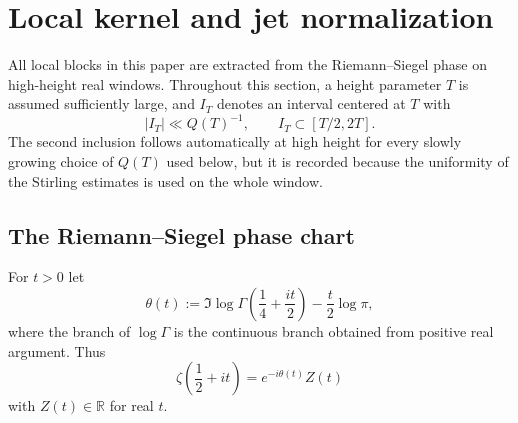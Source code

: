 %

\section{Local kernel and jet normalization}
\label{sec:local-kernel-and-jet-normalization}
\quad
{}\quad
{}\quad
{}\quad
{}\quad
{}
\par\medskip

All local blocks in this paper are extracted from the Riemann--Siegel phase
on high-height real windows.  Throughout this section, a height parameter
\(T\) is assumed sufficiently large, and \(I_T\) denotes an interval centered
at \(T\) with
\[
        |I_T|\ll Q(T)^{-1},
        \qquad I_T\subset [T/2,2T].
\]
The second inclusion follows automatically at high height for every slowly
growing choice of \(Q(T)\) used below, but it is recorded because the
uniformity of the Stirling estimates is used on the whole window.

\subsection{The Riemann--Siegel phase chart}
\label{subsec:local-phase-chart}

\begin{definition}
\label{def:riemann-siegel-phase}
For \(t>0\) let
\begin{equation}
\label{eq:theta-definition}
 \theta(t)
 := \Im \log \Gamma\!\left(\frac14+\frac{it}{2}\right)
    -\frac{t}{2}\log\pi,
\end{equation}
where the branch of \(\log\Gamma\) is the continuous branch obtained from
positive real argument.  Thus
\[
        \zeta\!\left(\frac12+it\right)
        =e^{-i\theta(t)}Z(t)
\]
with \(Z(t)\in\mathbb R\) for real \(t\).
\end{definition}

